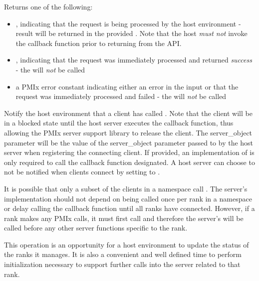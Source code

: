 Returns one of the following:

\begin{itemize}
    \item {}, indicating that the request is being processed by the host environment - result will be returned in the provided . Note that the host \emph{must not} invoke the callback function prior to returning from the \ac{API}.
    \item {}, indicating that the request was immediately processed and returned \textit{success} - the  will \textit{not} be called
    \item a PMIx error constant indicating either an error in the input or that the request was immediately processed and failed - the  will \textit{not} be called
\end{itemize}

\descr

Notify the host environment that a client has called .
Note that the client will be in a blocked state until the host server executes the callback function, thus allowing the \ac{PMIx} server support library to release
the client.
The server_object parameter will be the value of the server_object parameter passed to
 by the host server when registering the connecting client.  If provided, an implementation of 
is only required to
call the callback function designated.  A host server can choose to not be notified when clients connect by setting  to .

It is possible that only a subset of the clients in a namespace call .   The server's  implementation
should not depend on being called once per rank in a namespace or delay calling the callback function until all ranks have connected.
However, if a rank makes any \ac{PMIx} calls, it must first call  and
therefore the server's  will be called before any other server functions specific to the rank.

\advicermstart
 This operation is an opportunity for a host environment
 to update the status of the ranks it manages.  It is also a convenient and well defined time to perform initialization necessary to
 support further calls into the server related to that rank.
 \advicermend

